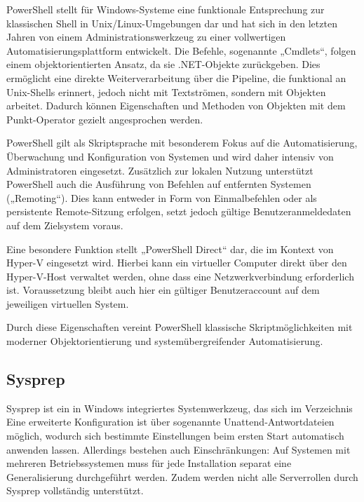 \documentclass[a4paper,12pt]{article}
\begin{document}
PowerShell stellt für Windows-Systeme eine funktionale Entsprechung zur klassischen Shell in Unix/Linux-Umgebungen dar und hat sich in den letzten Jahren von einem Administrationswerkzeug zu einer vollwertigen Automatisierungsplattform entwickelt. Die Befehle, sogenannte „Cmdlets“, folgen einem objektorientierten Ansatz, da sie .NET-Objekte zurückgeben. Dies ermöglicht eine direkte Weiterverarbeitung über die Pipeline, die funktional an Unix-Shells erinnert, jedoch nicht mit Textströmen, sondern mit Objekten arbeitet. Dadurch können Eigenschaften und Methoden von Objekten mit dem Punkt-Operator gezielt angesprochen werden.

PowerShell gilt als Skriptsprache mit besonderem Fokus auf die Automatisierung, Überwachung und Konfiguration von Systemen und wird daher intensiv von Administratoren eingesetzt. Zusätzlich zur lokalen Nutzung unterstützt PowerShell auch die Ausführung von Befehlen auf entfernten Systemen („Remoting“). Dies kann entweder in Form von Einmalbefehlen oder als persistente Remote-Sitzung erfolgen, setzt jedoch gültige Benutzeranmeldedaten auf dem Zielsystem voraus.

Eine besondere Funktion stellt „PowerShell Direct“ dar, die im Kontext von Hyper-V eingesetzt wird. Hierbei kann ein virtueller Computer direkt über den Hyper-V-Host verwaltet werden, ohne dass eine Netzwerkverbindung erforderlich ist. Voraussetzung bleibt auch hier ein gültiger Benutzeraccount auf dem jeweiligen virtuellen System.

Durch diese Eigenschaften vereint PowerShell klassische Skriptmöglichkeiten mit moderner Objektorientierung und systemübergreifender Automatisierung.\cite{garren2025utilizing,microsoft2025-powershell-direct}\\

\subsection{Sysprep}
Sysprep ist ein in Windows integriertes Systemwerkzeug, das sich im Verzeichnis %
Eine erweiterte Konfiguration ist über sogenannte Unattend‑Antwortdateien möglich, wodurch sich bestimmte Einstellungen beim ersten Start automatisch anwenden lassen. Allerdings bestehen auch Einschränkungen: Auf Systemen mit mehreren Betriebssystemen muss für jede Installation separat eine Generalisierung durchgeführt werden. Zudem werden nicht alle Serverrollen durch Sysprep vollständig unterstützt.\cite{microsoft2021-sysprep-generalize,microsoft2021-sysprep-overview}
\end{document}
